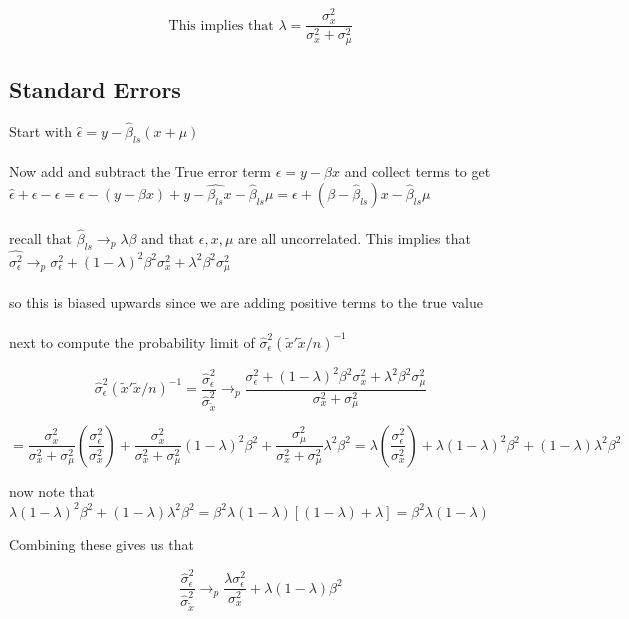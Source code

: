 \documentclass[11pt]{article}
\newcommand{\plim}{\rightarrow_{p}}
\begin{document}
 $$\text{This implies that } \lambda = \frac{\sigma_{x}^2}{\sigma_{x}^2 + \sigma_{\mu}^2} $$
 
\subsection{Standard Errors}

Start with $ \hat{\epsilon} = y - \hat{\beta}_{ls}(x + \mu) $ \\
\\
 Now add and subtract the True error term $\epsilon = y - \beta x$ and collect terms to get $ \hat{\epsilon} + \epsilon - \epsilon = \epsilon - (y - \beta x) + y - \hat{\beta_{ls}} x - \hat{\beta}_{ls}\mu = \epsilon + (\beta - \hat{\beta}_{ls})x - \hat{\beta}_{ls} \mu$
 \\ \\
 recall that $\hat{\beta}_{ls} \rightarrow_{p} \lambda \beta $ and that $ \epsilon, x, \mu$ are all uncorrelated. This implies that $\hat{\sigma_{\epsilon}^2} \plim \sigma_{\epsilon}^2 + (1-\lambda)^2 \beta^2\sigma_{x}^2 + \lambda^2 \beta^2 \sigma_{\mu}^2$
 \\ \\ 
 so this is biased upwards since we are adding positive terms to the true value 
 \\ \\ 
 next to compute the probability limit of $\hat{\sigma}_{\epsilon}^2(\tilde{x}'\tilde{x}/n)^{-1}$
 
 
 $$ \hat{\sigma}_{\epsilon}^2 (\tilde{x}'\tilde{x}/n)^{-1} = \frac{\hat{\sigma}_{\epsilon}^2}{\hat{\sigma}_{\tilde{x}}^2} \plim \frac{ \sigma_{\epsilon}^2 + (1-\lambda)^2 \beta^2\sigma_{x}^2 + \lambda^2 \beta^2 \sigma_{\mu}^2}{\sigma_{x}^2 + \sigma_{\mu}^2}$$
 
$$ =\frac{\sigma_{x}^2}{\sigma_{x}^2 + \sigma_{\mu}^2}(\frac{\sigma_{\epsilon}^2}{\sigma_{x}^2}) + \frac{\sigma_{x}^2}{\sigma_{x}^2 + \sigma_{\mu}^2}(1-\lambda)^2 \beta^2 + \frac{\sigma_{\mu}^2}{\sigma_{x}^2 + \sigma_{\mu}^2} \lambda^2 \beta^2  = \lambda(\frac{\sigma_{\epsilon}^2}{\sigma_{x}^2}) + \lambda (1-\lambda)^2 \beta^2 + (1-\lambda) \lambda^2 \beta^2  $$

now note that $  \lambda (1-\lambda)^2 \beta^2 + (1-\lambda) \lambda^2 \beta^2 = \beta^2\lambda (1-\lambda)[(1-\lambda) + \lambda] = \beta^2 \lambda (1-\lambda)$

Combining these gives us that 

$$ \frac{\hat{\sigma}_{\epsilon}^2}{\hat{\sigma}_{\tilde{x}}^2} \plim  \frac{\lambda \sigma_{\epsilon}^2}{\sigma_{x}^2} + \lambda(1-\lambda)\beta^2 $$
\end{document}
